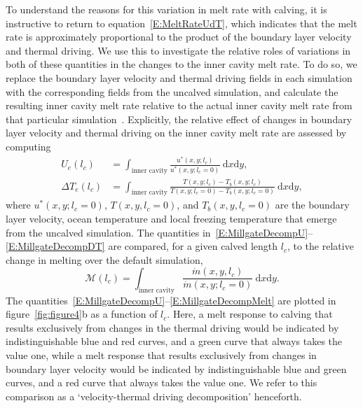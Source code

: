 \documentclass[draft]{agujournal2019}
\begin{document}
To understand the reasons for this variation in melt rate with calving, it is instructive to return to equation~\eqref{E:MeltRateUdT}, which indicates that the melt rate is approximately proportional to the product of the boundary layer velocity and thermal driving. We use this to investigate the relative roles of variations in both of these quantities in the changes to the inner cavity melt rate. To do so, we replace the boundary layer velocity and thermal driving fields in each simulation with the corresponding fields from the uncalved simulation, and calculate the resulting inner cavity melt rate relative to the actual inner cavity melt rate from that particular simulation~\cite{Millgate2013JGROceans}. Explicitly, the relative effect of changes in boundary layer velocity and thermal driving on the inner cavity melt rate are assessed by computing
 \begin{align}
U_{e}(l_c) &=  \int_{\text{inner cavity}}\frac{u^*(x,y; l_c)}{u^*(x,y; l_c = 0)}~\mathrm{d}x\mathrm{d}y, \label{E:MillgateDecompU}\\ \Delta T_{e}(l_c) &= \int_{\text{inner cavity}}\frac{T(x,y; l_c) - T_b(x,y; l_c)}{T(x,y; l_c = 0) - T_{b}(x,y; l_c = 0)}~\mathrm{d}x\mathrm{d}y,\label{E:MillgateDecompDT}
 \end{align}
  where $u^*(x,y;l_c = 0)$, $T(x,y,l_c = 0)$, and $T_b(x,y,l_c = 0)$ are the boundary layer velocity, ocean temperature and local freezing temperature that emerge from the uncalved simulation. The quantities in~\eqref{E:MillgateDecompU}--\eqref{E:MillgateDecompDT} are compared, for a given calved length $l_c$, to the relative change in melting over the default simulation,
 \begin{equation}\label{E:MillgateDecompMelt}
   \mathcal{M}(l_c) =  \int_{\text{inner cavity}}\frac{\dot{m}(x,y, l_c)}{\dot{m}(x,y; l_c = 0)}~\mathrm{d}x\mathrm{d}y.
 \end{equation}
The quantities~\eqref{E:MillgateDecompU}--\eqref{E:MillgateDecompMelt} are plotted in figure~\ref{fig:figure4}b as a function of $l_c$.  Here, a melt response to calving that results exclusively from changes in the thermal driving would be indicated by indistinguishable blue and red curves, and a green curve that always takes the value one, while a melt response that results exclusively from changes in boundary layer velocity would be indicated by indistinguishable blue and green curves, and a red curve that always takes the value one. We refer to this comparison as a `velocity-thermal driving decomposition' henceforth. %
\end{document}
